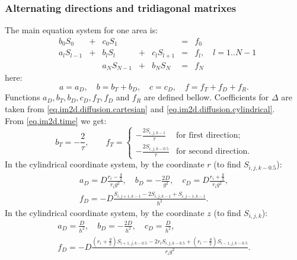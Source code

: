 \documentclass[a4paper,10pt]{article}
\begin{document}
\subsubsection{Alternating directions and tridiagonal matrixes}
The main equation system for one area is:
\begin{equation}
\begin{aligned}
    &b_0 S_0     &+& c_0 S_1     & &             &=& f_0\\
    &a_l S_{l-1} &+& b_l S_l     &+& c_l S_{l+1} &=& f_l,\quad l = 1..N-1\\
    &            & & a_N S_{N-1} &+& b_N S_N     &=& f_N
\end{aligned}
\end{equation}
here:
\begin{equation}
    a = a_D,\quad
    b = b_T + b_D,\quad
    c = c_D,\quad
    f = f_T + f_D + f_R.
\end{equation}
Functions $a_D, b_T, b_D, c_D, f_T, f_D$ and $ f_R$ are defined bellow.
Coefficients for $\Delta$ are taken from \eqref{eq.im2d.diffusion.cartesian}
and \eqref{eq.im2d.diffusion.cylindrical}.\\
From \eqref{eq.im2d.time} we get:
\begin{equation}
    b_T = -\frac{2}{\tau},\qquad
    f_T = \begin{cases}
            -\frac{2 S_{i,j,k-1  }}{\tau} & \text{for first direction};\\
            -\frac{2 S_{i,j,k-0.5}}{\tau} & \text{for second direction.}
          \end{cases}
\end{equation}
In the cylindrical coordinate system, by the coordinate $r$ (to find $S_{i,j,k-0.5}$):
\begin{multline}
    a_D = D \frac{r_i - \frac{g}{2}}{r_i g^2},\quad
    b_D = -\frac{2 D}{g^2},\quad
    c_D = D \frac{r_i + \frac{g}{2}}{r_i g^2},\\
    f_D = -D \frac{S_{i,j+1,k-1} - 2 S_{i,j,k-1} + S_{i,j-1,k-1}}{h^2}.
\end{multline}
In the cylindrical coordinate system, by the coordinate $z$ (to find $S_{i,j,k}$):
\begin{multline}
    a_D = \frac{D}{h^2},\quad
    b_D = -\frac{2 D}{h^2},\quad
    c_D = \frac{D}{h^2},\\
    f_D = - D \frac{ (r_i + \frac{g}{2})S_{i+1,j,k-0.5} - 2 r_i S_{i,j,k-0.5} + (r_i - \frac{g}{2}) S_{i-1,j,k-0.5} }{r_i g^2}.
\end{multline}
\end{document}
